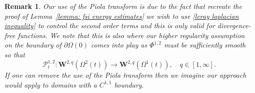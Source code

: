 \documentclass[a4paper]{amsart}
\numberwithin{equation}{section}
\theoremstyle{plain}
\newtheorem{remark}[theorem]{Remark}
\newcommand{\mbf}[1]{\mathbf{#1}}
\begin{document}
    \begin{remark}
        Our use of the Piola transform is due to the fact that recreate the proof of Lemma~\ref{lemma: fsi energy estimates} we wish to use \eqref{leray laplacian inequality} to control the second order terms and this is only valid for divergence-free functions.
        We note that this is also where our higher regularity assumption on the boundary of $\partial \Omega(0)$ comes into play as $\Phi^{1,2}$ must be sufficiently smooth so that
        \[ \mathcal{P}_t^{1,2} : \mbf{W}^{2,q}(\Omega^2(t)) \rightarrow \mbf{W}^{2,q}(\Omega^1(t)), \quad q \in [1,\infty]. \]
        If one can remove the use of the Piola transform then we imagine our approach would apply to domains with a $C^{1,1}$ boundary.
    \end{remark}
    
\end{document}
